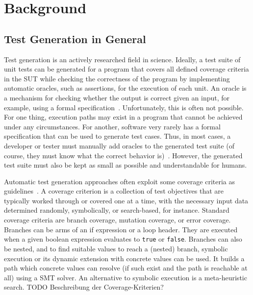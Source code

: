 \documentclass[paper=a4,%
  twoside,%
  BCOR4mm,%
  abstract=true,%
  toc=bibliography,%
  chapterprefix=true,%
  toc=bibliographynumbered,%
  open=right,%
  english,%
  pagesize=pdftex]{scrreprt}
\begin{document}
\clearpage

\chapter{Background}
\label{chap:backgroud}
\section{Test Generation in General}
Test generation is an actively researched field in science. Ideally, a test suite of unit tests can be generated for a program that covers all defined coverage criteria in the \ac{SUT} while checking the correctness of the program by implementing automatic oracles, such as assertions, for the execution of each unit. An oracle is a mechanism for checking whether the output is correct given an input, for example, using a formal specification~\cite{McMinn2009}. Unfortunately, this is often not possible. For one thing, execution paths may exist in a program that cannot be achieved under any circumstances. For another, software very rarely has a formal specification that can be used to generate test cases. Thus, in most cases, a developer or tester must manually add oracles to the generated test suite (of course, they must know what the correct behavior is)~\cite{Fraser_2013}. However, the generated test suite must also be kept as small as possible and understandable for humans.

Automatic test generation approaches often exploit some coverage criteria as guidelines~\cite{Fraser_2011a}. A coverage criterion is a collection of test objectives that are typically worked through or covered one at a time, with the necessary input data determined randomly, symbolically, or search-based, for instance. Standard coverage criteria are branch coverage, mutation coverage, or error coverage. Branches can be arms of an if expression or a loop header. They are executed when a given boolean expression evaluates to \texttt{true} or \texttt{false}. Branches can also be nested, and to find suitable values to reach a (nested) branch, symbolic execution or its dynamic extension with concrete values can be used. It builds a path which concrete values can resolve (if such exist and the path is reachable at all) using a \ac{SMT} solver. An alternative to symbolic execution is a meta-heuristic search. TODO Beschreibung der Coverage-Kriterien?

\end{document}
